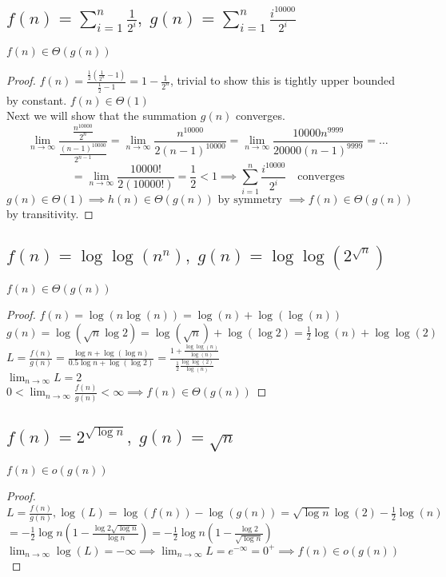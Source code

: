 \documentclass{article}
\begin{document}
\subsection{$f(n) = \sum_{i=1}^n \frac{1}{2^i},\; g(n) = \sum_{i=1}^n \frac{i^{10000}}{2^i}$}
$f(n) \in \Theta(g(n))$
\begin{proof}
   $f(n) = \frac{\frac{1}{2}(\frac{1}{2^n} -1)}{\frac{1}{2} - 1} = 1 - \frac{1}{2^n}$, 
   trivial to show this is tightly upper bounded by constant. $f(n) \in \Theta(1)$\\
   Next we will show that the summation $g(n)$ converges. \\
   \[\lim_{n \rightarrow \infty} \frac{\frac{n^{10000}}{2^n}}{\frac{(n-1)^{10000}}{2^{n-1}}} 
   = \lim_{n \rightarrow \infty} \frac{n^{10000}}{2(n-1)^{10000}} = \lim_{n \rightarrow \infty} \frac{10000 n^{9999}}{20000(n-1)^{9999}} = \dots\]
   \[= \lim_{n \rightarrow \infty} \frac{10000!}{2(10000!)} = \frac{1}{2} < 1 \implies \sum_{i=1}^n \frac{i^{10000}}{2^i} \quad \text{converges}\]
   $g(n) \in \Theta(1) \implies h(n) \in \Theta(g(n)) \text{ by symmetry }\implies f(n) \in \Theta(g(n))$ by transitivity.
\end{proof}

\subsection{$f(n) = \log\log (n^n),\; g(n) = \log\log(2^{\sqrt{n}})$}
$f(n) \in \Theta(g(n))$
\begin{proof}
    $f(n) = \log(n \log(n )) = \log(n) + \log(\log(n))$\\
    $g(n) = \log(\sqrt{n}\log 2) = \log(\sqrt{n}) + \log(\log2) = \frac{1}{2}\log(n) + \log\log(2)$\\
    $L = \frac{f(n)}{g(n)} = \frac{\log n + \log(\log n)}{0.5 \log n + \log (\log 2)} = 
    \frac{1 + \frac{\log\log(n)}{\log(n)}}{\frac{1}{2} \frac{\log\log(2)}{\log(n)}}$\\
    $\lim_{n\rightarrow \infty} L = 2$\\
    $0 < \lim_{n \rightarrow \infty} \frac{f(n)}{g(n)} < \infty \implies f(n) \in \Theta(g(n))$
\end{proof}
\subsection{$f(n) = 2^{\sqrt{\log n}},\; g(n) = \sqrt{n}$}
$f(n) \in o(g(n))$
\begin{proof}
    $L = \frac{f(n)}{g(n)}, \log(L) = \log(f(n)) - \log(g(n)) = \sqrt{\log n}\log(2) - \frac{1}{2} \log(n) $\\
    $= -\frac{1}{2}\log n (1 - \frac{\log 2 \sqrt{\log n}}{\log n}) = -\frac{1}{2}\log n (1 - \frac{\log 2 }{\sqrt{\log n}}) $\\
    $\lim_{n\rightarrow\infty} \log(L) = -\infty \implies \lim_{n\rightarrow\infty} L = e^{-\infty} = 0^+ \implies f(n) \in o(g(n))$ 
\end{proof}
\end{document}

